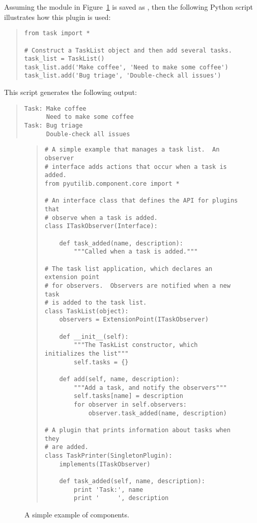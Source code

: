 

Assuming the module in Figure~\ref{fig:example1} 
is saved as , then the following Python script 
illustrates how this plugin is used:
\begin{quotation}
\begin{lstlisting}
from task import *

# Construct a TaskList object and then add several tasks.
task_list = TaskList()
task_list.add('Make coffee', 'Need to make some coffee')
task_list.add('Bug triage', 'Double-check all issues')
\end{lstlisting}
\end{quotation}
This script generates the following output:
\begin{quotation}
\begin{lstlisting}
Task: Make coffee
      Need to make some coffee
Task: Bug triage
      Double-check all issues
\end{lstlisting}
\end{quotation}


\begin{figure}
\center
\begin{quotation}
\begin{lstlisting}
# A simple example that manages a task list.  An observer 
# interface adds actions that occur when a task is added.
from pyutilib.component.core import *

# An interface class that defines the API for plugins that
# observe when a task is added.
class ITaskObserver(Interface):

    def task_added(name, description):
        """Called when a task is added."""

# The task list application, which declares an extension point
# for observers.  Observers are notified when a new task
# is added to the task list.
class TaskList(object):
    observers = ExtensionPoint(ITaskObserver)

    def __init__(self):
        """The TaskList constructor, which initializes the list"""
        self.tasks = {}

    def add(self, name, description):
        """Add a task, and notify the observers"""
        self.tasks[name] = description
        for observer in self.observers:
            observer.task_added(name, description)

# A plugin that prints information about tasks when they
# are added.
class TaskPrinter(SingletonPlugin):
    implements(ITaskObserver)

    def task_added(self, name, description):
        print 'Task:', name
        print '     ', description
\end{lstlisting}
\end{quotation}
\caption{A simple example of \pcasp components.}
\label{fig:example1}
\end{figure}



